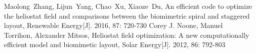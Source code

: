 \newpage
\appendix


\begin{thebibliography}{9}
Maolong~Zhang, Lijun~Yang, Chao~Xu, Xiaoze~Du, An efficient code to optimize the heliostat field and comparisons between the biomimetric spiral and staggered layout, Renewable Energy[J]. 2016, 87: 720-730
Corey J. Noone, Manuel Torrihon, Alexander Mitsos, Heliostat field optimization: A new computationally efficient model and biomimetic layout, Solar Energy[J]. 2012, 86: 792-803
\end{thebibliography}
